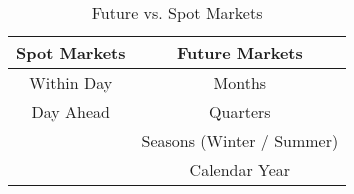 \begin{table}[H]
	\begin{center}
			\begin{tabular}{c |  c}
				Spot Markets & Future Markets \\
				\hline
		 		Within Day & Months \\
		 		Day Ahead & Quarters \\
		 		 & Seasons (Winter / Summer) \\
		 		 & Calendar Year
			\end{tabular}
	\end{center}
	\caption{Future vs. Spot Markets}
	\label{tab:markets}
\end{table}


